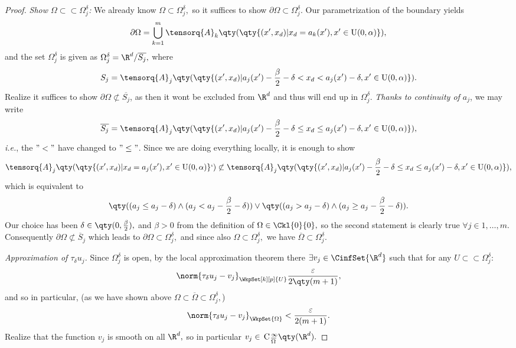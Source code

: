 \begin{proof}
\textit{Show $\Omega \subset \subset \Omega_j^{\delta}$:}
We already know $\Omega \subset \Omega_j^{\delta},$ so it suffices to show $\partial \Omega \subset \Omega_j^{\delta}.$ Our parametrization of the boundary yields
\[
	\partial \Omega = \bigcup_{k=1}^m \tensorq{A}_k\qty(\qty{(x',x_d)| x_d = a_k(x'), x' \in \text{U}(0,\alpha)}),
\]
and the set $\Omega_j^{\delta}$ is given as $\Omega_{j}^{\delta} = \R^{d} / \overline{S_j},$ where
\[
	S_j = \tensorq{A}_j\qty(\qty{(x',x_d)| a_j(x') - \frac{\beta}{2} - \delta < x_d < a_j(x') - \delta, x' \in \text{U}(0,\alpha)}).
\]
Realize it suffices to show $\partial \Omega \not \subset \overline{S_j}$, as then it wont be excluded from $\R^{d}$ and thus will end up in $\Omega_j^\delta.$ \textit{Thanks to continuity of $a_j$}, we may write
\[
	\overline{S_j} = \tensorq{A}_j\qty(\qty{(x',x_d)| a_j(x') - \frac{\beta}{2} - \delta \leq x_d \leq a_j(x') - \delta, x' \in \text{U}(0,\alpha)}),
\]
\textit{i.e.}, the $"<"$ have changed to $"\leq"$. Since we are doing everything locally, it is enough to show
\[
	\tensorq{A}_j\qty(\qty{(x',x_d)|x_d = a_j(x'), x' \in \text{U}(0,\alpha)}`) \not \subset \tensorq{A}_j\qty(\qty{(x',x_d)| a_j(x') - \frac{\beta}{2} - \delta \leq x_d \leq a_j(x') - \delta, x' \in \text{U}(0,\alpha)}),
\]
which is equivalent to
\[
	\qty((a_j \leq a_j - \delta) \wedge (a_j < a_j - \frac{\beta}{2} - \delta)) \vee \qty((a_j > a_j - \delta) \wedge (a_j \geq a_j - \frac{\beta}{2} - \delta)).
\]
Our choice has been $\delta \in \qty(0, \frac{\beta}{2}),$ and $\beta > 0$ from the definition of $\Omega \in \Ckl{0}{0},$ so the second statement is clearly true $\forall j \in {1, \dots, m}$. Consequently $\partial \Omega \not \subset \overline{S}_j$ which leads to $\partial \Omega \subset \Omega_j^{\delta},$ and since also $\Omega \subset \Omega_j^{\delta},$ we have $\overline{\Omega} \subset \Omega_j^{\delta}.$

\textit{Approximation of $\tau_{\delta}u_j$.}
Since $\Omega_{j}^\delta$ is open, by the local approximation theorem there $\exists v_j \in \CinfSet{\R^{d}}$ such that for any $U \subset \subset \Omega_j^{\delta}$:
\[
	\norm{\tau_{\delta}u_j - v_j}_{\WkpSet[k][p]{U}} \frac{\varepsilon}{2\qty(m+1)},
\]
and so in particular, (as we have shown above $\Omega \subset \overline{\Omega} \subset \Omega_{j}^\delta,$)
\[
	\norm{\tau_{\delta}u_j - v_j}_{\WkpSet{\Omega}}  < \frac{\varepsilon}{2(m+1)}.
\]
Realize that the function $v_j$ is smooth on all $\R^{d},$ so in particular $v_j \in \, \text{C} \,_{\overline{\Omega}}^{\infty}\qty(\R^{d}).$



\end{proof}
